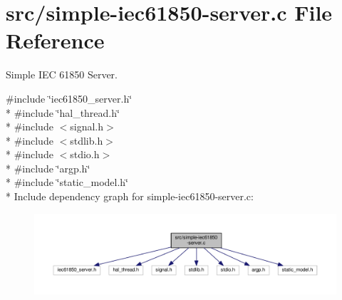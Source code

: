 \hypertarget{simple-iec61850-server_8c}{}\section{src/simple-\/iec61850-\/server.c File Reference}
\label{simple-iec61850-server_8c}


Simple I\+EC 61850 Server.  


{\ttfamily \#include \char`\"{}iec61850\+\_\+server.\+h\char`\"{}}\\*
{\ttfamily \#include \char`\"{}hal\+\_\+thread.\+h\char`\"{}}\\*
{\ttfamily \#include $<$signal.\+h$>$}\\*
{\ttfamily \#include $<$stdlib.\+h$>$}\\*
{\ttfamily \#include $<$stdio.\+h$>$}\\*
{\ttfamily \#include \char`\"{}argp.\+h\char`\"{}}\\*
{\ttfamily \#include \char`\"{}static\+\_\+model.\+h\char`\"{}}\\*
Include dependency graph for simple-\/iec61850-\/server.c\+:
\nopagebreak
\begin{figure}[H]
\begin{center}
\leavevmode
\includegraphics[width=350pt]{simple-iec61850-server_8c__incl}
\end{center}
\end{figure}
